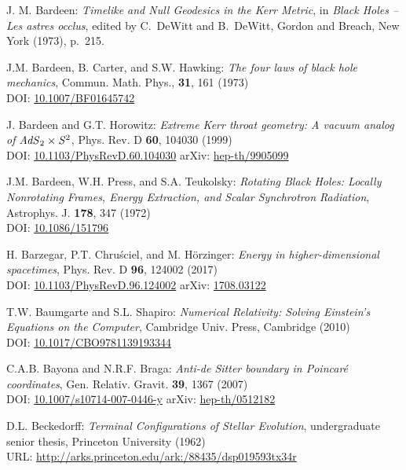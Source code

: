 \begin{thebibliography}{123}
J. M. Bardeen: {\em Timelike and Null Geodesics in the Kerr Metric},
in {\em Black Holes -- Les astres occlus},  edited by C.~DeWitt and B.~DeWitt,
Gordon and Breach, New York (1973), p.~215.

J.M. Bardeen, B. Carter, and S.W. Hawking: {\em The four laws of black
hole mechanics}, Commun. Math. Phys., {\bf 31}, 161 (1973)\\
DOI: \href{https://doi.org/10.1007/BF01645742}{10.1007/BF01645742}

J. Bardeen and G.T. Horowitz:
{\em Extreme Kerr throat geometry: A vacuum analog of ${\it AdS}_2\times{\it S}^2$},
Phys. Rev. D {\bf 60}, 104030 (1999)\\
DOI: \href{https://doi.org/10.1103/PhysRevD.60.104030}{10.1103/PhysRevD.60.104030}\hfill
arXiv: \href{https://arxiv.org/abs/hep-th/9905099}{hep-th/9905099}

J.M. Bardeen, W.H. Press, and S.A. Teukolsky:
{\em Rotating Black Holes: Locally Nonrotating Frames, Energy Extraction, and Scalar Synchrotron Radiation},
Astrophys. J. {\bf  178}, 347 (1972)\\
DOI: \href{https://doi.org/10.1086/151796}{10.1086/151796}

H. Barzegar, P.T. Chruściel, and M. Hörzinger:
{\em Energy in higher-dimensional spacetimes},
Phys. Rev. D {\bf 96}, 124002 (2017)\\
DOI: \href{https://doi.org/10.1103/PhysRevD.96.124002}{10.1103/PhysRevD.96.124002}\hfill
arXiv: \href{https://arxiv.org/abs/1708.03122}{1708.03122}

T.W. Baumgarte and S.L. Shapiro:
{\em Numerical Relativity: Solving Einstein's Equations on the Computer},
Cambridge Univ. Press, Cambridge (2010)\\
DOI: \href{https://doi.org/10.1017/CBO9781139193344}{10.1017/CBO9781139193344}

C.A.B. Bayona and N.R.F. Braga:
{\em Anti-de Sitter boundary in Poincaré coordinates},
Gen. Relativ. Gravit. {\bf 39}, 1367 (2007)\\
DOI: \href{https://doi.org/10.1007/s10714-007-0446-y}{10.1007/s10714-007-0446-y}\hfill
arXiv: \href{https://arxiv.org/abs/hep-th/0512182}{hep-th/0512182}

D.L. Beckedorff:
{\em Terminal Configurations of Stellar Evolution},
undergraduate senior thesis, Princeton University (1962)\\
URL: \url{http://arks.princeton.edu/ark:/88435/dsp019593tx34r}


\end{thebibliography}
